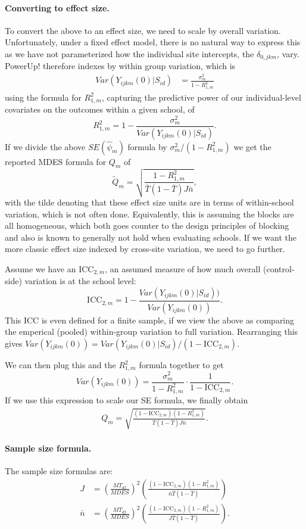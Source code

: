 \documentclass[12pt]{article}
\begin{document}
\paragraph{Converting to effect size.}
To convert the above to an effect size, we need to scale by overall variation.
Unfortunately, under a fixed effect model, there is no natural way to express this as we have not parameterized how the individual site intercepts, the $\delta_{0,jkm}$, vary.
PowerUp! therefore indexes by within group variation, which is
\begin{align*}
Var( Y_{ijkm}(0) | S_{id} ) &= \frac{ \sigma^2_m }{ 1 - R^2_{1,m} } \end{align*}
using the formula for $R^2_{1,m}$, capturing the predictive power of our individual-level covariates on the outcomes within a given school, of
\[ R^2_{1,m} = 1 - \frac{ \sigma^2_m }{ Var( Y_{ijkm}(0) |  S_{id} )} . \]
If we divide the above $SE(\hat{\psi}_m)$ formula by $\sigma^2_m/(1 - R^2_{1,m})$ we get  the reported MDES formula for $Q_m$ of
\[ 
\tilde{Q}_m = \sqrt{\frac{1-R^2_{1,m}}{\bar{T}(1 - \bar{T}) J \bar{n}}} ,
\]
with the tilde denoting that these effect size units are in terms of within-school variation, which is not often done.
Equivalently, this is assuming the blocks are all homogeneous, which both goes counter to the design principles of blocking and also is known to generally not hold when evaluating schools.
If we want the more classic effect size indexed by cross-site variation, we need to go further.

Assume we have an $\text{ICC}_{2,m}$, an assumed measure of how much overall (control-side) variation is at the school level:
\[ \text{ICC}_{2,m} = 1 - \frac{ Var( Y_{ijkm}(0) |  S_{id} ) ) }{ Var( Y_{ijkm}(0)) } . \]
This ICC is even defined for a finite sample, if we view the above as comparing the emperical (pooled) within-group variation to full variation.
Rearranging this gives $Var( Y_{ijkm}(0) ) = Var(  Y_{ijkm}(0) |  S_{id} ) /(1 - \text{ICC}_{2,m})$.

We can then plug this and the $R^2_{1,m}$ formula together to get
\[ Var( Y_{ijkm}(0) ) = \frac{ \sigma^2_m }{ 1 - R^2_{1,m} } \cdot \frac{1}{1- \text{ICC}_{2,m}} .\]
If we use this expression to scale our SE formula, we finally obtain
\begin{align} Q_m = \sqrt{\frac{(1-\text{ICC}_{2,m})(1-R^2_{1,m})}{\bar{T}(1 - \bar{T}) J \bar{n}}} . \end{align}

\paragraph{Sample size formula.} 
The sample size formulas are:
\begin{align}
J &= \left(\frac{MT_{df}}{MDES}\right)^2 \left(\frac{(1-\text{ICC}_{2,m})(1-R^2_{1,m})}{\bar{n} \bar{T} (1 - \bar{T})} \right)\\
\bar{n} &= \left(\frac{MT_{df}}{MDES}\right)^2 \left(\frac{(1-\text{ICC}_{2,m})(1-R^2_{1,m})}{J \bar{T} (1 - \bar{T})} \right) .
\end{align}
\end{document}
